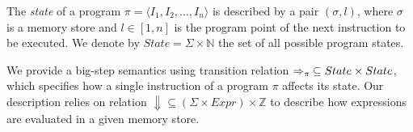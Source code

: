 \begin{definition}
\label{de:prog-state}
The {\em state} of a program $\pi=\langle I_1, I_2, \ldots, I_n \rangle$ is described by a pair $(\sigma,l)$, where $\sigma$ is a memory store and $l\in [1,n]$ is the program point of the next instruction to be executed. We denote by $State=\Sigma\times \mathbb{N}$ the set of all possible program states.
\end{definition}

\noindent We provide a big-step semantics using transition relation $\Rightarrow_{\pi}\:\subseteq State\times State$, which specifies how a single instruction of a program $\pi$ affects its state. Our description relies on relation $\Downarrow\subseteq(\Sigma\times Expr)\times \mathbb{Z}$ to describe how expressions are evaluated in a given memory store.


